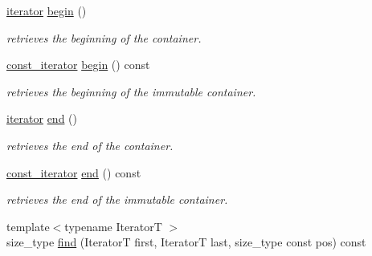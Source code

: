 \begin{DoxyCompactItemize}
\item 
\hypertarget{classhryky_1_1_substring_a7d550a484228287b752fd562709b8981}{\hyperlink{classhryky_1_1iterator_1_1random_1_1_mutable}{iterator} \hyperlink{classhryky_1_1_substring_a7d550a484228287b752fd562709b8981}{begin} ()}\label{classhryky_1_1_substring_a7d550a484228287b752fd562709b8981}

\begin{DoxyCompactList}\small\item\em retrieves the beginning of the container. \end{DoxyCompactList}\item 
\hypertarget{classhryky_1_1_substring_a21b54707fd7805e536903fbe56228146}{\hyperlink{classhryky_1_1iterator_1_1random_1_1_immutable}{const\-\_\-iterator} \hyperlink{classhryky_1_1_substring_a21b54707fd7805e536903fbe56228146}{begin} () const }\label{classhryky_1_1_substring_a21b54707fd7805e536903fbe56228146}

\begin{DoxyCompactList}\small\item\em retrieves the beginning of the immutable container. \end{DoxyCompactList}\item 
\hypertarget{classhryky_1_1_substring_aa231be07658dfab51eb17900b57e4af3}{\hyperlink{classhryky_1_1iterator_1_1random_1_1_mutable}{iterator} \hyperlink{classhryky_1_1_substring_aa231be07658dfab51eb17900b57e4af3}{end} ()}\label{classhryky_1_1_substring_aa231be07658dfab51eb17900b57e4af3}

\begin{DoxyCompactList}\small\item\em retrieves the end of the container. \end{DoxyCompactList}\item 
\hypertarget{classhryky_1_1_substring_a2c2221a0171fe303343540b47f19edd7}{\hyperlink{classhryky_1_1iterator_1_1random_1_1_immutable}{const\-\_\-iterator} \hyperlink{classhryky_1_1_substring_a2c2221a0171fe303343540b47f19edd7}{end} () const }\label{classhryky_1_1_substring_a2c2221a0171fe303343540b47f19edd7}

\begin{DoxyCompactList}\small\item\em retrieves the end of the immutable container. \end{DoxyCompactList}\item 
\hypertarget{classhryky_1_1_substring_a095d9b41e44fd8be92c16c7a9ab049bf}{{\footnotesize template$<$typename Iterator\-T $>$ }\\size\-\_\-type \hyperlink{classhryky_1_1_substring_a095d9b41e44fd8be92c16c7a9ab049bf}{find} (Iterator\-T first, Iterator\-T last, size\-\_\-type const pos) const }\label{classhryky_1_1_substring_a095d9b41e44fd8be92c16c7a9ab049bf}


\end{DoxyCompactItemize}
